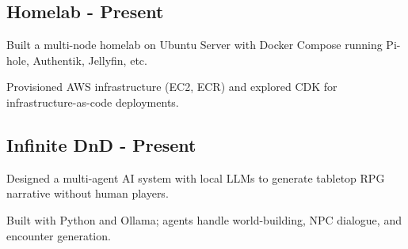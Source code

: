 \subsection{{Homelab \hfill { - Present}}}
\begin{zitemize}
    \item Built a multi-node homelab on Ubuntu Server with Docker Compose running Pi-hole, Authentik, Jellyfin, etc.
    \item Provisioned AWS infrastructure (EC2, ECR) and explored CDK for infrastructure-as-code deployments.
\end{zitemize}

\subsection{{Infinite DnD \hfill { - Present}}}
\begin{zitemize}
    \item Designed a multi-agent AI system with local LLMs to generate tabletop RPG narrative without human players.
    \item Built with Python and Ollama; agents handle world-building, NPC dialogue, and encounter generation.
\end{zitemize}
